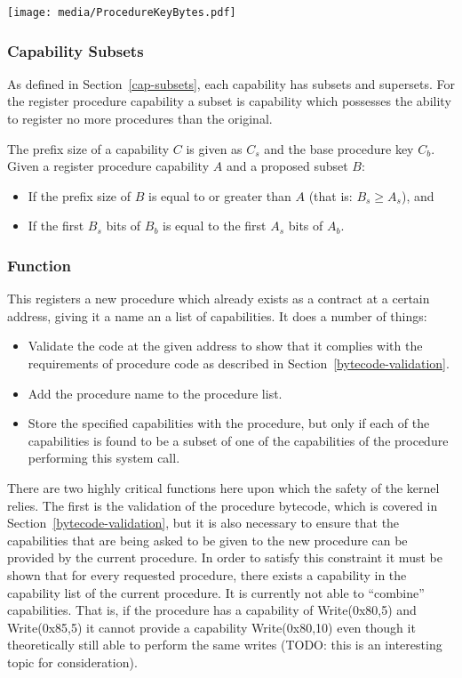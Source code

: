 \documentclass[english,a4paper]{article}
\let\oldparagraph\subsubsection
\renewcommand{\subsubsection}[1]{\oldparagraph{#1}\mbox{}}
\begin{document}
\texttt{[image: media/ProcedureKeyBytes.pdf]}

\subsubsection{Capability Subsets}
As defined in Section~\ref{cap-subsets}, each capability has subsets and
supersets. For the register procedure capability a subset is capability which
possesses the ability to register no more procedures than the original.

The prefix size of a capability $C$ is given as $C_s$ and the base procedure key
$C_b$. Given a register procedure capability $A$ and a proposed subset $B$:
\begin{itemize}
  \item If the prefix size of $B$ is equal to or greater than $A$ (that is: $B_s
  \geq A_s$), and
  \item If the first $B_s$ bits of $B_b$ is equal to the first $A_s$ bits of
  $A_b$.
\end{itemize}

\subsubsection{Function}
This registers a new procedure which already exists as a contract at a certain
address, giving it a name an a list of capabilities. It does a number of things:

\begin{itemize}
  \item Validate the code at the given address to show that it complies with the
  requirements of procedure code as described in
  Section~\ref{bytecode-validation}.
  \item Add the procedure name to the procedure list.
  \item Store the specified capabilities with the procedure, but only if each of
  the capabilities is found to be a subset of one of the capabilities of the
  procedure performing this system call.
\end{itemize}

There are two highly critical functions here upon which the safety of the kernel
relies. The first is the validation of the procedure bytecode, which is covered
in Section~\ref{bytecode-validation}, but it is also necessary to ensure that
the capabilities that are being asked to be given to the new procedure can be
provided by the current procedure. In order to satisfy this constraint it must
be shown that for every requested procedure, there exists a capability in the
capability list of the current procedure. It is currently not able to
``combine'' capabilities. That is, if the procedure has a capability of
Write(0x80,5) and Write(0x85,5) it cannot provide a capability Write(0x80,10)
even though it theoretically still able to perform the same writes (TODO: this
is an interesting topic for consideration).
\end{document}
